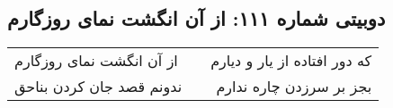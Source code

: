 \begin{center}
\section*{دوبیتی شماره ۱۱۱: از آن انگشت نمای روزگارم}
\label{sec:111}
\begin{longtable}{l p{0.5cm} r}
از آن انگشت نمای روزگارم
&&
که دور افتاده از یار و دیارم
\\
ندونم قصد جان کردن بناحق
&&
بجز بر سرزدن چاره ندارم
\\
\end{longtable}
\end{center}
